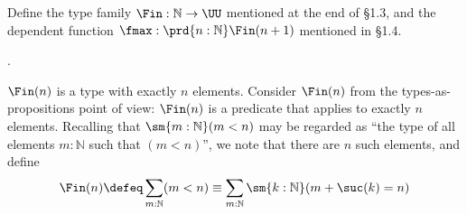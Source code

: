     Define the type family $\Fin : \mathbb{N} \to \UU$
    mentioned at the end of \S1.3, and the dependent function $\fmax :
    \prd{n : \mathbb{N}} \Fin(n + 1)$ mentioned in \S1.4. \begin{coqdoccode}
\coqdocemptyline
\coqdocnoindent
{}\coqdocindent{0.50em}
  .\coqdoceol
\coqdocemptyline
\end{coqdoccode}
\soln  
    $\Fin(n)$ is a type with exactly $n$ elements.  Consider $\Fin(n)$ from the
    types-as-propositions point of view: $\Fin(n)$ is a
    predicate that applies to exactly $n$ elements.  Recalling that
    $\sm{m:\mathbb{N}}(m < n)$ may be regarded as ``the type of all elements $m :
    \mathbb{N}$ such that $(m < n)$'', we note that there are $n$ such elements,
    and define
    \[
    \Fin(n) 
    \defeq \sum_{m:\mathbb{N}} (m < n)
    \equiv \sum_{m:\mathbb{N}} \sm{k:\mathbb{N}}(m+ \suc(k) = n)
    \]
